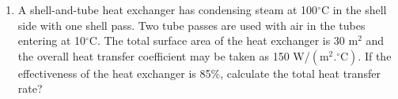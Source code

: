 \documentclass[calculator,fluidstables,allquestions,datasheet]{exam}
\begin{document}
\begin{question}
\begin{enumerate}
\item\label{HE_Exam2} A shell-and-tube heat exchanger has condensing steam at 100$^{\circ}$C in the shell side with one shell pass. Two tube passes are used with air in the tubes entering at 10$^{\circ}$C. The total surface area of the heat exchanger is 30 m$^{2}$ and the overall heat transfer coefficient may be taken as 150 W/$\left(\text{m}^{2}.^{\circ}\text{C}\right)$. If the effectiveness of the heat exchanger is 85$\%$, calculate the total heat transfer rate?


\end{enumerate}

\end{question}
\end{document}
